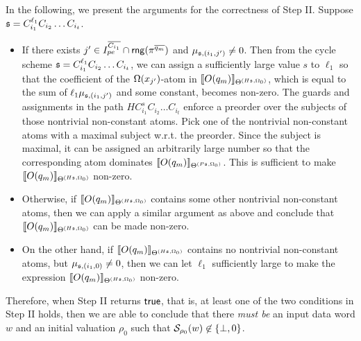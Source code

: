\medskip
In the following, we present the arguments for the correctness of Step II. Suppose ${\mathfrak{s} } =C_{i_1}^{\ell_1} C_{i_2} \dots C_{i_t}$.
\begin{itemize}
\item If there exists $j' \in I^{\overline{C_{i_1}}}_{pe} \cap \mathsf{rng}(\pi^{\overline{q_m}})$ and 
$\mu_{{\mathfrak{s} },(i_1,j')} \neq 0$. 
Then from the cycle scheme ${\mathfrak{s} }=C_{i_1}^{\ell_1} C_{i_2} \dots C_{i_t}$, we can assign a sufficiently large value $s$ to $\ell_1$ so that the coefficient of the $\Omega(x_{j'})$-atom in $\llbracket O(q_{m})\rrbracket_{\Theta^{(H{\mathfrak{s} } ,\Omega_0)}}$, which is equal to the sum of  $\ell_1 \mu_{{\mathfrak{s} },(i_1,j')}$ and some constant,  becomes non-zero.  The guards and assignments in the path $H C_{i_1}^{s} C_{i_2} \dots C_{i_t}$ enforce a preorder over the subjects of those nontrivial non-constant atoms.
Pick one of the nontrivial non-constant atoms with a maximal subject w.r.t. the preorder. Since the subject is maximal, it can be assigned an arbitrarily large number so that the corresponding atom dominates $\llbracket O(q_{m})\rrbracket_{\Theta^{(P{\mathfrak{s} },\Omega_0)}}$.  This is sufficient to make $\llbracket O(q_{m})\rrbracket_{\Theta^{(H{\mathfrak{s} },\Omega_0)}}$ non-zero.
%
\item Otherwise, if $\llbracket O(q_{m})\rrbracket_{\Theta^{(H{\mathfrak{s} },\Omega_0)}}$ contains some other nontrivial non-constant atoms, then we can apply a similar argument as above and conclude that $\llbracket O(q_{m})\rrbracket_{\Theta^{(H{\mathfrak{s} },\Omega_0)}}$ can be made non-zero. 

\item On the other hand, if $\llbracket O(q_{m})\rrbracket_{\Theta^{(H{\mathfrak{s} },\Omega_0)}}$ contains no nontrivial non-constant atoms, but $\mu_{{\mathfrak{s} },(i_1,0)} \neq 0$, then we can let $\ell_1$ sufficiently large to make the expression $\llbracket O(q_{m})\rrbracket_{\Theta^{(H{\mathfrak{s} },\Omega_0)}}$ non-zero. 
\end{itemize} 
Therefore, when Step II returns $\mathsf{true}$, that is, at least one of the two conditions in Step II holds, then we are able to conclude that there \emph{must be}  an input data word $w$ and an initial valuation $\rho_0$ such that $ {\mathcal{S} }_{\rho_0}(w) \not \in \{\bot, 0\}$. 

\smallskip

